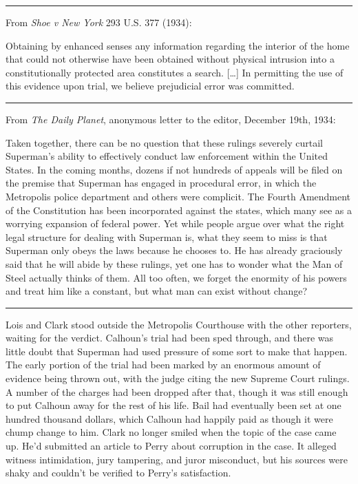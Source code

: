 \documentclass[ebook,12pt]{memoir}
\begin{document}
\begin{center}\rule{0.5\linewidth}{\linethickness}\end{center}

From \emph{Shoe v New York} 293 U.S. 377 (1934):

Obtaining by enhanced senses any information regarding the interior of
the home that could not otherwise have been obtained without physical
intrusion into a constitutionally protected area constitutes a search.
{{[}}\ldots{}{{]}} In permitting the use of this evidence upon trial, we
believe prejudicial error was committed.

\begin{center}\rule{0.5\linewidth}{\linethickness}\end{center}

From \emph{The Daily Planet}, anonymous letter to the editor, December
19th, 1934:

Taken together, there can be no question that these rulings severely
curtail Superman's ability to effectively conduct law enforcement within
the United States. In the coming months, dozens if not hundreds of
appeals will be filed on the premise that Superman has engaged in
procedural error, in which the Metropolis police department and others
were complicit. The Fourth Amendment of the Constitution has been
incorporated against the states, which many see as a worrying expansion
of federal power. Yet while people argue over what the right legal
structure for dealing with Superman is, what they seem to miss is that
Superman only obeys the laws because he chooses to. He has already
graciously said that he will abide by these rulings, yet one has to
wonder what the Man of Steel actually thinks of them. All too often, we
forget the enormity of his powers and treat him like a constant, but
what man can exist without change?

\begin{center}\rule{0.5\linewidth}{\linethickness}\end{center}

Lois and Clark stood outside the Metropolis Courthouse with the other
reporters, waiting for the verdict. Calhoun's trial had been sped
through, and there was little doubt that Superman had used pressure of
some sort to make that happen. The early portion of the trial had been
marked by an enormous amount of evidence being thrown out, with the
judge citing the new Supreme Court rulings. A number of the charges had
been dropped after that, though it was still enough to put Calhoun away
for the rest of his life. Bail had eventually been set at one hundred
thousand dollars, which Calhoun had happily paid as though it were chump
change to him. Clark no longer smiled when the topic of the case came
up. He'd submitted an article to Perry about corruption in the case. It
alleged witness intimidation, jury tampering, and juror misconduct, but
his sources were shaky and couldn't be verified to Perry's satisfaction.
\end{document}
